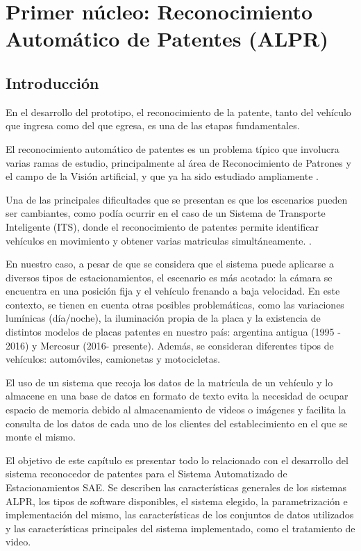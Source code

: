 \chapter{Primer núcleo: Reconocimiento Automático de Patentes (ALPR)}  \label{cap:alpr}

\section{Introducción}\label{sec:introALPR}
En el desarrollo del prototipo, el reconocimiento de la patente, tanto del vehículo que ingresa  como del que egresa, es una de las etapas fundamentales.

El reconocimiento automático de patentes es un problema típico que involucra varias ramas de estudio, principalmente al área de Reconocimiento de Patrones y el campo de la Visión artificial, y que ya ha sido estudiado ampliamente \cite{TRA-147} \cite{0a392c343021f65fa374375e148cb5770a88} \cite{2011-Reconocimiento_automatico_de_numero_de_patente} \cite{13EM9}.

Una de las principales dificultades que se presentan es que los escenarios pueden ser cambiantes, como podía ocurrir en el caso de un Sistema de Transporte Inteligente (ITS), donde el reconocimiento de patentes permite identificar vehículos en movimiento y obtener varias matriculas simultáneamente. \cite{0a392c343021f65fa374375e148cb5770a88} \cite{LicensePlates2018}.

En nuestro caso, a pesar de que se considera que el sistema puede aplicarse a diversos tipos de estacionamientos, el escenario es más acotado: la cámara se encuentra en una posición fija y el vehículo frenando a baja velocidad. En este contexto, se tienen en cuenta otras posibles problemáticas, como las variaciones lumínicas (día/noche), la iluminación propia de la placa y la existencia de distintos modelos de placas patentes en nuestro país: argentina antigua (1995 - 2016) y Mercosur (2016- presente). Además, se consideran diferentes tipos de vehículos: automóviles, camionetas y motocicletas.

El uso de un sistema que recoja los datos de la matrícula de un vehículo y lo almacene en una base de datos en formato de texto evita la necesidad de ocupar espacio de memoria debido al almacenamiento de videos o imágenes y facilita la consulta de los datos de cada uno de los clientes del establecimiento en el que se monte el mismo.

El objetivo de este capítulo es presentar todo lo relacionado con el desarrollo del sistema reconocedor de patentes para el Sistema Automatizado de Estacionamientos SAE. Se describen las características generales de los sistemas ALPR, los tipos de software disponibles, el sistema elegido, la parametrización e implementación del mismo, las características de los conjuntos de datos utilizados y las características principales del sistema implementado, como el tratamiento de video. 

